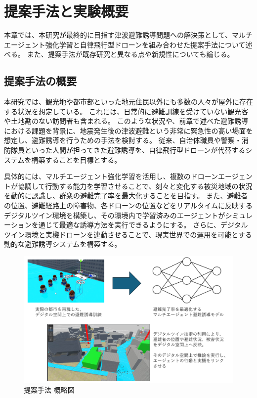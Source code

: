 \chapter{提案手法と実験概要}  
本章では、本研究が最終的に目指す津波避難誘導問題への解決策として、マルチエージェント強化学習と自律飛行型ドローンを組み合わせた提案手法について述べる。
また、提案手法が既存研究と異なる点や新規性についても論じる。

\section{提案手法の概要}  
本研究では、観光地や都市部といった地元住民以外にも多数の人々が屋外に存在する状況を想定している。
これには、日常的に避難訓練を受けていない観光客や土地勘のない訪問者も含まれる。
このような状況や、前章で述べた避難誘導における課題を背景に、地震発生後の津波避難という非常に緊急性の高い場面を想定し、避難誘導を行うための手法を検討する。
従来、自治体職員や警察・消防隊員といった人間が担ってきた避難誘導を、自律飛行型ドローンが代替するシステムを構築することを目標とする。

具体的には、マルチエージェント強化学習を活用し、複数のドローンエージェントが協調して行動する能力を学習させることで、刻々と変化する被災地域の状況を動的に認識し、群衆の避難完了率を最大化することを目指す。
また、避難者の位置、避難経路上の障害物、各ドローンの位置などをリアルタイムに反映するデジタルツイン環境を構築し、その環境内で学習済みのエージェントがシミュレーションを通じて最適な誘導方法を実行できるようにする。
さらに、デジタルツイン環境と実機ドローンを連動させることで、現実世界での運用を可能とする動的な避難誘導システムを構築する。

\begin{figure}[H] 
  \centering 
  \includegraphics[width=1.0\textwidth]{Figures/2024-12-06 182816.png}
  \caption{提案手法 概略図} 
  \label{fig:01} 
\end{figure}

